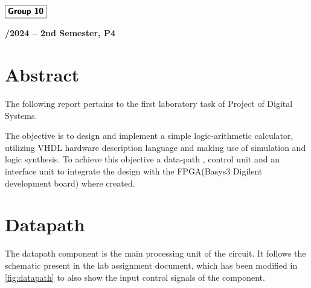 \documentclass[12pt]{article}
\begin{document}
\begin{flushleft}
    \large $\boxed{\text{\bf \fontfamily{cmss}\selectfont Group 10}}$\\[4.0cm]
\end{flushleft}
    
\begin{center}
    \large \bf {}/2024 -- 2nd Semester, P4
\end{center}

\thispagestyle{empty}

\setcounter{page}{0}

\newpage

\tableofcontents 

\newpage

\section{Abstract}
The following report pertains to the first laboratory task of Project of Digital Systems.

The objective is to design and implement a simple logic-arithmetic calculator, utilizing VHDL hardware description language and making use of simulation and logic synthesis. 
To achieve this objective a data-path , control unit and an interface
unit to integrate the design with the FPGA(Basys3 Digilent development board) where created. 

\section{Datapath}

The datapath component is the main processing unit of the circuit. It follows the schematic present in the lab assignment document, which has been modified in \ref{fig:datapath} to also show the input control signals of the component.
\end{document}
